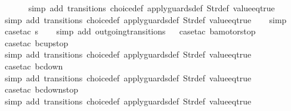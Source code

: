\begin{isabellebody}
\ \ \ \ \ \isamarkupfalse%
\ {\isacharparenleft}simp\ add{\isacharcolon}\ transitions\ choice{\isacharunderscore}def\ apply{\isacharunderscore}guards{\isacharunderscore}def\ Str{\isacharunderscore}def\ value{\isacharunderscore}eq{\isacharunderscore}true{\isacharparenright}\isanewline
\ \ \ \ \isamarkupfalse%
\ {\isacharparenleft}simp\ add{\isacharcolon}\ transitions\ choice{\isacharunderscore}def\ apply{\isacharunderscore}guards{\isacharunderscore}def\ Str{\isacharunderscore}def\ value{\isacharunderscore}eq{\isacharunderscore}true{\isacharparenright}\isanewline
\ \ \isamarkupfalse%
\ simp\isanewline
\ \ \isamarkupfalse%
\ {\isacharparenleft}case{\isacharunderscore}tac\ {\isachardoublequoteopen}s{\isacharequal}{}{\isachardoublequoteclose}{\isacharparenright}\isanewline
\ \ \isamarkupfalse%
\ {\isacharparenleft}simp\ add{\isacharcolon}\ outgoing{\isacharunderscore}transitions{\isacharunderscore}{}{\isacharparenright}\isanewline
\ \isamarkupfalse%
\ {\isacharparenleft}case{\isacharunderscore}tac\ {\isachardoublequoteopen}ba{\isacharequal}motorstop{}{\isachardoublequoteclose}{\isacharparenright}\isanewline
\ \ \ \ \isamarkupfalse%
\ {\isacharparenleft}case{\isacharunderscore}tac\ {\isachardoublequoteopen}bc{\isacharequal}up{}{}stop{\isachardoublequoteclose}{\isacharparenright}\isanewline
\ \ \ \ \ \isamarkupfalse%
\ {\isacharparenleft}simp\ add{\isacharcolon}\ transitions\ choice{\isacharunderscore}def\ apply{\isacharunderscore}guards{\isacharunderscore}def\ Str{\isacharunderscore}def\ value{\isacharunderscore}eq{\isacharunderscore}true{\isacharparenright}\isanewline
\ \ \ \ \isamarkupfalse%
\ {\isacharparenleft}case{\isacharunderscore}tac\ {\isachardoublequoteopen}bc{\isacharequal}down{}{}{\isachardoublequoteclose}{\isacharparenright}\isanewline
\ \ \ \ \ \isamarkupfalse%
\ {\isacharparenleft}simp\ add{\isacharcolon}\ transitions\ choice{\isacharunderscore}def\ apply{\isacharunderscore}guards{\isacharunderscore}def\ Str{\isacharunderscore}def\ value{\isacharunderscore}eq{\isacharunderscore}true{\isacharparenright}\isanewline
\ \ \ \ \isamarkupfalse%
\ {\isacharparenleft}case{\isacharunderscore}tac\ {\isachardoublequoteopen}bc{\isacharequal}down{}{}stop{\isachardoublequoteclose}{\isacharparenright}\isanewline
\ \ \ \ \ \isamarkupfalse%
\ {\isacharparenleft}simp\ add{\isacharcolon}\ transitions\ choice{\isacharunderscore}def\ apply{\isacharunderscore}guards{\isacharunderscore}def\ Str{\isacharunderscore}def\ value{\isacharunderscore}eq{\isacharunderscore}true{\isacharparenright}\isanewline

\end{isabellebody}
